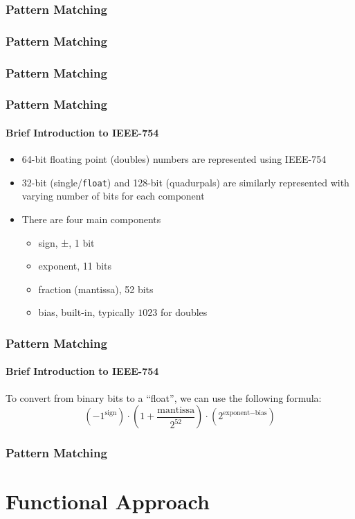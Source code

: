 \documentclass[english]{beamer}
\begin{document}
\begin{frame}[fragile]
\frametitle{Pattern Matching}

\end{frame}

\begin{frame}[fragile]
\frametitle{Pattern Matching}

\end{frame}

\begin{frame}[fragile]
\frametitle{Pattern Matching}

\end{frame}

\begin{frame}
\frametitle{Pattern Matching}
\framesubtitle{Brief Introduction to IEEE-754}
\begin{itemize}
\item{64-bit floating point (doubles) numbers are represented using IEEE-754}
\item{32-bit (single/\texttt{float}) and 128-bit (quadurpals) are similarly
represented with varying number of bits for each component}
\item{There are four main components}
\begin{itemize}
\item{sign, ±, 1 bit}
\item{exponent, 11 bits}
\item{fraction (mantissa), 52 bits}
\item{bias, built-in, typically $1023$ for doubles}
\end{itemize}
\end{itemize}
\end{frame}

\begin{frame}
\frametitle{Pattern Matching}
\framesubtitle{Brief Introduction to IEEE-754}
To convert from binary bits to a ``float'', we can use the following formula:
$$
\left({}{-1}^{\text{sign}}\right){} \cdot{}
\left({}
1 + \frac{\text{mantissa}}{2^{52}}
\right){}
\cdot{} \left({}2^{\text{exponent} - \text{bias}}\right){}
$$
\end{frame}

\begin{frame}[fragile]
\frametitle{Pattern Matching}

\end{frame}

\section{Functional Approach}
\end{document}
